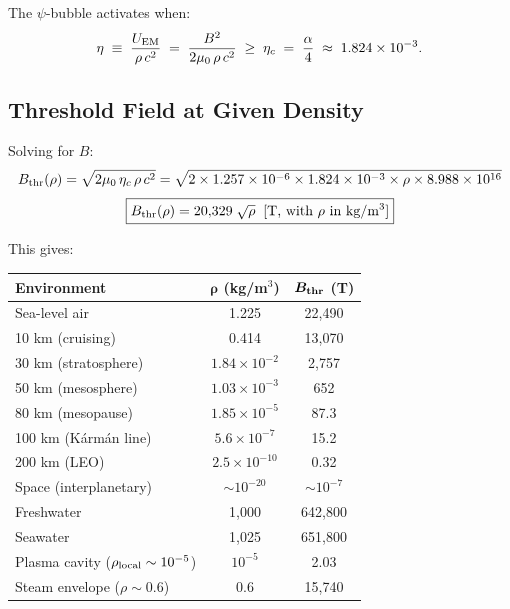 \documentclass[12pt,a4paper]{article}
\begin{document}
The $\psi$-bubble activates when:
\begin{equation}\label{eq:eta}
\eta \;\equiv\; \frac{U_{\rm EM}}{\rho\, c^2}
\;=\; \frac{B^2}{2\mu_0\,\rho\,c^2}
\;\geq\; \eta_c \;=\; \frac{\alpha}{4}
\;\approx\; 1.824 \times 10^{-3}.
\end{equation}

\subsection{Threshold Field at Given Density}

Solving for $B$:
\begin{equation}\label{eq:Bthr}
B_{\rm thr}(\rho)
= \sqrt{2\mu_0\,\eta_c\,\rho\,c^2}
= \sqrt{2 \times 1.257\times 10^{-6} \times 1.824\times 10^{-3}
    \times \rho \times 8.988\times 10^{16}}
\end{equation}
\begin{equation}
\boxed{B_{\rm thr}(\rho) = 20{,}329 \;\sqrt{\rho} \;\;\text{[T, with $\rho$ in kg/m$^3$]}}
\end{equation}

This gives:
\begin{center}
\begin{tabular}{lcc}
\toprule
\textbf{Environment} & $\boldsymbol{\rho}$ \textbf{(kg/m$^3$)} & $\boldsymbol{B_{\rm thr}}$ \textbf{(T)} \\
\midrule
Sea-level air        & 1.225            & 22{,}490 \\
10 km (cruising)     & 0.414            & 13{,}070 \\
30 km (stratosphere) & $1.84\times 10^{-2}$ & 2{,}757 \\
50 km (mesosphere)   & $1.03\times 10^{-3}$ & 652 \\
80 km (mesopause)    & $1.85\times 10^{-5}$ & 87.3 \\
100 km (K\'{a}rm\'{a}n line) & $5.6\times 10^{-7}$ & 15.2 \\
200 km (LEO)         & $2.5\times 10^{-10}$ & 0.32 \\
Space (interplanetary) & $\sim 10^{-20}$ & $\sim 10^{-7}$ \\
\midrule
Freshwater           & 1{,}000          & 642{,}800 \\
Seawater             & 1{,}025          & 651{,}800 \\
Plasma cavity ($\rho_{\rm local} \sim 10^{-5}$) & $10^{-5}$ & 2.03 \\
Steam envelope ($\rho \sim 0.6$) & 0.6  & 15{,}740 \\
\bottomrule
\end{tabular}
\end{center}
\end{document}
